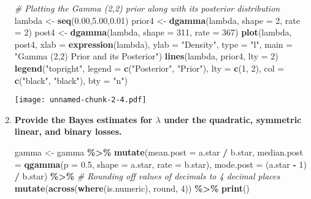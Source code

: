 \documentclass[]{article}
\newenvironment{Shaded}{\begin{snugshade}}{\end{snugshade}}
\newcommand{\AttributeTok}[1]{\textcolor[rgb]{0.13,0.29,0.53}{#1}}
\newcommand{\CommentTok}[1]{\textcolor[rgb]{0.56,0.35,0.01}{\textit{#1}}}
\newcommand{\DecValTok}[1]{\textcolor[rgb]{0.00,0.00,0.81}{#1}}
\newcommand{\FloatTok}[1]{\textcolor[rgb]{0.00,0.00,0.81}{#1}}
\newcommand{\FunctionTok}[1]{\textcolor[rgb]{0.13,0.29,0.53}{\textbf{#1}}}
\newcommand{\NormalTok}[1]{#1}
\newcommand{\OtherTok}[1]{\textcolor[rgb]{0.56,0.35,0.01}{#1}}
\newcommand{\SpecialCharTok}[1]{\textcolor[rgb]{0.81,0.36,0.00}{\textbf{#1}}}
\newcommand{\StringTok}[1]{\textcolor[rgb]{0.31,0.60,0.02}{#1}}
\begin{document}
\begin{enumerate}
\begin{Shaded}
\begin{Highlighting}[]
\CommentTok{\# Plotting the Gamma (2,2) prior along with its posterior distribution}
\NormalTok{lambda }\OtherTok{\textless{}{-}} \FunctionTok{seq}\NormalTok{(}\FloatTok{0.00}\NormalTok{,}\FloatTok{5.00}\NormalTok{,}\FloatTok{0.01}\NormalTok{)}
\NormalTok{prior4 }\OtherTok{\textless{}{-}} \FunctionTok{dgamma}\NormalTok{(lambda, }\AttributeTok{shape =} \DecValTok{2}\NormalTok{, }\AttributeTok{rate =} \DecValTok{2}\NormalTok{)}
\NormalTok{post4 }\OtherTok{\textless{}{-}} \FunctionTok{dgamma}\NormalTok{(lambda, }\AttributeTok{shape =} \DecValTok{311}\NormalTok{, }\AttributeTok{rate =} \DecValTok{367}\NormalTok{)}
\FunctionTok{plot}\NormalTok{(lambda, post4, }\AttributeTok{xlab =} \FunctionTok{expression}\NormalTok{(lambda), }\AttributeTok{ylab =} \StringTok{"Density"}\NormalTok{, }
     \AttributeTok{type =} \StringTok{"l"}\NormalTok{, }\AttributeTok{main =} \StringTok{"Gamma (2,2) Prior and its Posterior"}\NormalTok{)}
\FunctionTok{lines}\NormalTok{(lambda, prior4, }\AttributeTok{lty =} \DecValTok{2}\NormalTok{)}
\FunctionTok{legend}\NormalTok{(}\StringTok{"topright"}\NormalTok{, }\AttributeTok{legend =} \FunctionTok{c}\NormalTok{(}\StringTok{"Posterior"}\NormalTok{, }\StringTok{"Prior"}\NormalTok{),  }
       \AttributeTok{lty =} \FunctionTok{c}\NormalTok{(}\DecValTok{1}\NormalTok{, }\DecValTok{2}\NormalTok{),  }
       \AttributeTok{col =} \FunctionTok{c}\NormalTok{(}\StringTok{"black"}\NormalTok{, }\StringTok{"black"}\NormalTok{),  }
       \AttributeTok{bty =} \StringTok{"n"}\NormalTok{) }
\end{Highlighting}
\end{Shaded}

\texttt{[image: unnamed-chunk-2-4.pdf]}

\item \textbf{Provide the Bayes estimates for $\lambda$ under the quadratic, symmetric linear, and binary losses.}

\begin{Shaded}
\begin{Highlighting}[]
\NormalTok{gamma }\OtherTok{\textless{}{-}}\NormalTok{ gamma }\SpecialCharTok{\%\textgreater{}\%}
  \FunctionTok{mutate}\NormalTok{(}\AttributeTok{mean.post =}\NormalTok{ a.star }\SpecialCharTok{/}\NormalTok{ b.star,}
         \AttributeTok{median.post =} \FunctionTok{qgamma}\NormalTok{(}\AttributeTok{p =} \FloatTok{0.5}\NormalTok{, }\AttributeTok{shape =}\NormalTok{ a.star, }\AttributeTok{rate =}\NormalTok{ b.star),}
         \AttributeTok{mode.post =}\NormalTok{ (a.star }\SpecialCharTok{{-}} \DecValTok{1}\NormalTok{) }\SpecialCharTok{/}\NormalTok{ b.star) }\SpecialCharTok{\%\textgreater{}\%}
  \CommentTok{\# Rounding off values of decimals to 4 decimal places}
  \FunctionTok{mutate}\NormalTok{(}\FunctionTok{across}\NormalTok{(}\FunctionTok{where}\NormalTok{(is.numeric), round, }\DecValTok{4}\NormalTok{)) }\SpecialCharTok{\%\textgreater{}\%}
  \FunctionTok{print}\NormalTok{()}
\end{Highlighting}
\end{Shaded}


\end{enumerate}
\end{document}
